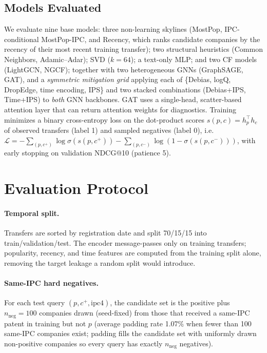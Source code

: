 \documentclass[preprint,12pt]{elsarticle}
\begin{document}
\subsection{Models Evaluated}
\label{sec:models}
We evaluate nine base models: three non-learning skylines (MostPop,
IPC-conditional MostPop-IPC, and Recency, which ranks candidate companies by the
recency of their most recent training transfer); two structural heuristics
(Common Neighbors, Adamic--Adar); SVD ($k{=}64$); a
text-only MLP; and two CF models (LightGCN, NGCF);
together with two heterogeneous GNNs (GraphSAGE, GAT), and a
\emph{symmetric mitigation grid} applying each of \{Debias, logQ, DropEdge, time
encoding, IPS\} and two stacked combinations (Debias+IPS, Time+IPS) to \emph{both}
GNN backbones. GAT uses a single-head, scatter-based attention layer that can return
attention weights for diagnostics. Training minimizes a binary cross-entropy loss
on the dot-product scores $s(p,c)=h_p^{\top}h_c$ of observed transfers (label 1)
and sampled negatives (label 0), i.e.\ $\mathcal{L}=-\sum_{(p,c^{+})}\log\sigma(s(p,c^{+}))-\sum_{(p,c^{-})}\log(1-\sigma(s(p,c^{-})))$, with early stopping on validation NDCG@10
(patience 5).

\section{Evaluation Protocol}
\label{sec:protocol}

\paragraph{Temporal split.} Transfers are sorted by registration date and split
70/15/15 into train/validation/test. The encoder message-passes only on training
transfers; popularity, recency, and time features are computed from the training
split alone, removing the target leakage a random split would introduce.

\paragraph{Same-IPC hard negatives.} For each test query $(p,c^{+},\mathrm{ipc4})$,
the candidate set is the positive plus $n_{\mathrm{neg}}=100$ companies drawn
(seed-fixed) from those that received a same-IPC patent in training but not $p$
(average padding rate 1.07\% when fewer than 100 same-IPC companies exist; padding fills the candidate set with uniformly drawn non-positive companies so every query has exactly $n_{\mathrm{neg}}$ negatives).
\end{document}
